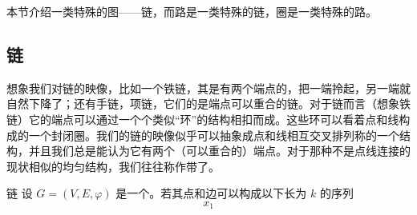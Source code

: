 
本节介绍一类特殊的图——链，而路是一类特殊的链，圈是一类特殊的路。

\subsection{链}
想象我们对链的映像，比如一个铁链，其是有两个端点的，把一端拎起，另一端就自然下降了；还有手链，项链，它们的是端点可以重合的链。对于链而言（想象铁链）它的端点可以通过一个个类似“环”的结构相扣而成。这些环可以看着点和线构成的一个封闭圈。我们的链的映像似乎可以抽象成点和线相互交叉排列称的一个结构，并且我们总是能认为它有两个（可以重合的）端点。对于那种不是点线连接的现状相似的均匀结构，我们往往称作带了。

\begin{definition}{链}
设 $G=(V,E,\varphi)$ 是一个。若其点和边可以构成以下长为 $k$ 的序列
\begin{equation}
x_1
\end{equation}

\end{definition}














